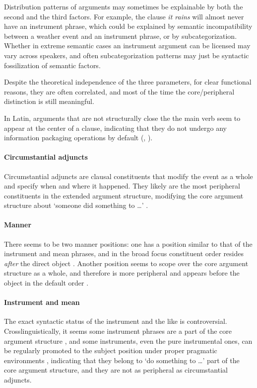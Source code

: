 \documentclass[a4paper, oneside, 12pt]{report}
\newcommand*{\citepage}[1]{p.~{#1}}
\newcommand*{\citepages}[1]{pp.~{#1}}
\newcommand{\form}[1]{\emph{#1}}
\newcommand{\translate}[1]{`#1'}
\begin{document}
Distribution patterns of arguments may sometimes be explainable
by both the second and the third factors. 
For example, the clause \form{it rains} will almost never have an instrument phrase,
which could be explained by semantic incompatibility between
a weather event and an instrument phrase,
or by subcategorization. 
Whether in extreme semantic cases an instrument argument can be licensed
may vary across speakers,
and often subcategorization patterns may just be syntactic fossilization of semantic factors.

Despite the theoretical independence of the three parameters,
for clear functional reasons, they are often correlated,
and most of the time the core/peripheral distinction is still meaningful.

In Latin, arguments that are not structurally close the the main verb
seem to appear at the center of a clause,
indicating that they do not undergo any information packaging operations by default 
(, ).

\paragraph*{Circumstantial adjuncts}
Circumstantial adjuncts are clausal constituents that
modify the event as a whole and specify when and where it happened.
They likely are the most peripheral constituents in the extended argument structure,
modifying the core argument structure about \translate{someone did something to \dots}
\citep[\citepage{29}]{cinque1999adverbs}.

\paragraph*{Manner}
There seems to be two manner positions:
one has a position similar to that of the instrument and mean phrases,
and in the broad focus constituent order resides \emph{after} the direct object
\citep[\citepage{71-75}]{devine2006latin}.
Another position seems to scope over the core argument structure as a whole,
and therefore is more peripheral and appears before the object
in the default order
\cite[\citepages{101-109}]{devine2006latin}. 

\paragraph*{Instrument and mean}
\label{sec:grammatical.clause.peripheral.instrument}
The exact syntactic status of the instrument and the like is controversial.
Crosslinguistically, it seems some instrument phrases are a part of the core argument structure
\citep{pascual2001syntactic},
and some instruments, even the pure instrumental ones, 
can be regularly promoted to the subject position
under proper pragmatic environments \citep{alexiadou2008instrument},
indicating that they belong to \translate{do something to \dots} part of the core argument structure,
and they are not as peripheral as circumstantial adjuncts. 
\end{document}
